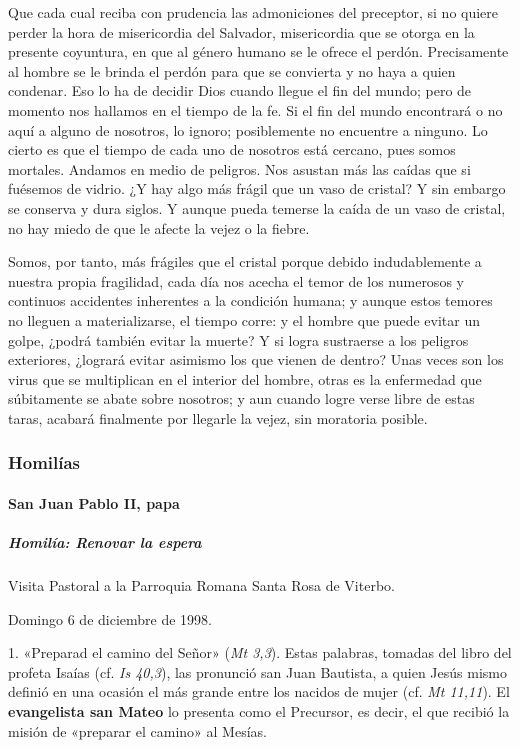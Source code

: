 \documentclass[]{article}
\let\oldparagraph\paragraph
\renewcommand{\paragraph}[1]{\oldparagraph{#1}\mbox{}}
\let\oldsubparagraph\subparagraph
\renewcommand{\subparagraph}[1]{\oldsubparagraph{#1}\mbox{}}
\begin{document}
Que cada cual reciba con prudencia las admoniciones del preceptor, si no
quiere perder la hora de misericordia del Salvador, misericordia que se
otorga en la presente coyuntura, en que al género humano se le ofrece el
perdón. Precisamente al hombre se le brinda el perdón para que se
convierta y no haya a quien condenar. Eso lo ha de decidir Dios cuando
llegue el fin del mundo; pero de momento nos hallamos en el tiempo de la
fe. Si el fin del mundo encontrará o no aquí a alguno de nosotros, lo
ignoro; posiblemente no encuentre a ninguno. Lo cierto es que el tiempo
de cada uno de nosotros está cercano, pues somos mortales. Andamos en
medio de peligros. Nos asustan más las caídas que si fuésemos de vidrio.
¿Y hay algo más frágil que un vaso de cristal? Y sin embargo se conserva
y dura siglos. Y aunque pueda temerse la caída de un vaso de cristal, no
hay miedo de que le afecte la vejez o la fiebre.

Somos, por tanto, más frágiles que el cristal porque debido
indudablemente a nuestra propia fragilidad, cada día nos acecha el temor
de los numerosos y continuos accidentes inherentes a la condición
humana; y aunque estos temores no lleguen a materializarse, el tiempo
corre: y el hombre que puede evitar un golpe, ¿podrá también evitar la
muerte? Y si logra sustraerse a los peligros exteriores, ¿logrará evitar
asimismo los que vienen de dentro? Unas veces son los virus que se
multiplican en el interior del hombre, otras es la enfermedad que
súbitamente se abate sobre nosotros; y aun cuando logre verse libre de
estas taras, acabará finalmente por llegarle la vejez, sin moratoria
posible.

\subsubsection{Homilías}\label{homiluxedas-1}

\paragraph{San Juan Pablo II, papa}\label{san-juan-pablo-ii-papa-1}

\subparagraph{Homilía: Renovar la
espera}\label{homiluxeda-renovar-la-espera}

Visita Pastoral a la Parroquia Romana Santa Rosa de Viterbo.

Domingo 6 de diciembre de 1998.

1. «Preparad el camino del Señor» (\emph{Mt 3,3}). Estas palabras,
tomadas del libro del profeta Isaías (cf. \emph{Is 40,3}), las pronunció
san Juan Bautista, a quien Jesús mismo definió en una ocasión el más
grande entre los nacidos de mujer (cf. \emph{Mt 11,11}). El
\textbf{evangelista san Mateo} lo presenta como el Precursor, es decir,
el que recibió la misión de «preparar el camino» al Mesías.
\end{document}
